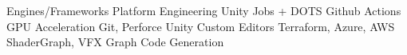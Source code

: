 

\begin{center}
\begin{skills}
                     {Engines/Frameworks}                {Platform Engineering}
                           {Unity Jobs + DOTS}                 {Github Actions}
               {GPU Acceleration}                  {Git, Perforce}
              {Unity Custom Editors}              {Terraform, Azure, AWS}
               {ShaderGraph, VFX Graph}            {Code Generation}
\end{skills}
\end{center}
